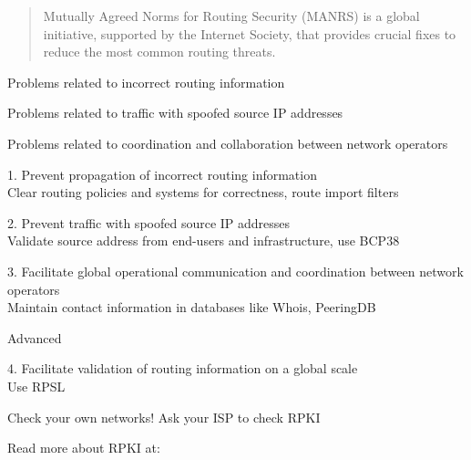 \documentclass[Screen16to9,17pt]{foils}
\begin{document}


\begin{quote}
  Mutually Agreed Norms for Routing Security (MANRS) is a global initiative, supported by the Internet Society, that provides crucial fixes to reduce the most common routing threats. ﻿
\end{quote}

\begin{list1}
\item Problems related to incorrect routing information
\item Problems related to traffic with spoofed source IP addresses
\item Problems related to coordination and collaboration between network operators
\item {\small{}}
\item {\small{}}
\end{list1}


\begin{list1}
\item 1. Prevent propagation of incorrect routing information\\
Clear routing policies and systems for correctness, route import filters
\item 2. Prevent traffic with spoofed source IP addresses\\
Validate source address from end-users and infrastructure, use BCP38
\item 3. Facilitate global operational communication and coordination between network operators\\
Maintain contact information in databases like Whois, PeeringDB
{\small{}}

\item Advanced
\item 4. Facilitate validation of routing information on a global scale\\
Use RPSL {\small{}}
\end{list1}




\begin{list2}
\item Check your own networks! Ask your ISP to check RPKI\\
\item Read more about RPKI at:\\
\end{list2}
\end{document}
